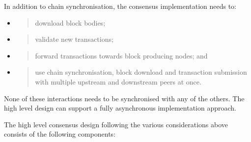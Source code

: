 \documentclass[11pt,a4paper]{article}
\begin{document}
In addition to chain synchronisation, the consensus implementation needs
to:

\begin{itemize}
\item
  \begin{quote}
  download block bodies;
  \end{quote}
\item
  \begin{quote}
  validate new transactions;
  \end{quote}
\item
  \begin{quote}
  forward transactions towards block producing nodes; and
  \end{quote}
\item
  \begin{quote}
  use chain synchronisation, block download and transaction submission
  with multiple upstream and downstream peers at once.
  \end{quote}
\end{itemize}

None of these interactions needs to be synchronised with any of the
others. The high level design can support a fully asynchronous
implementation approach.

The high level consensus design following the various considerations
above consists of the following components:
\end{document}

